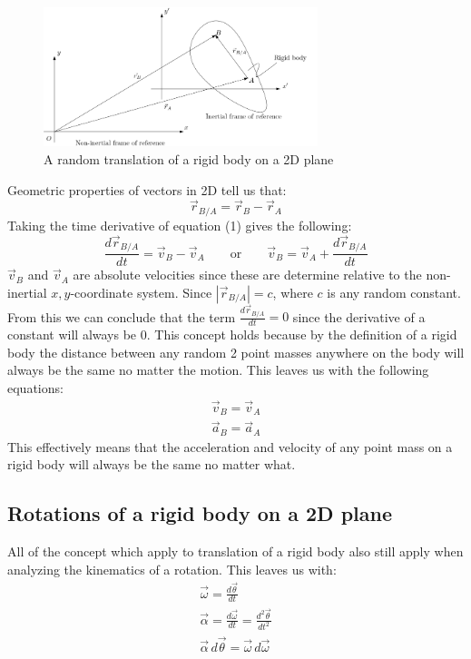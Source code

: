 \documentclass[11pt, a4paper]{article}
\begin{document}
\begin{figure}[h]
    \centerline{\includegraphics[width=80mm]{images/distance_vectors.png}}
    \caption{A random translation of a rigid body on a 2D plane}
\end{figure}
Geometric properties of vectors in 2D tell us that:
\begin{equation}
    \vec{r}_{B/A} = \vec{r}_B - \vec{r}_A
\end{equation}
Taking the time derivative of equation (1) gives the following:
\begin{equation}
    \frac{d\vec{r}_{B/A}}{dt} = \vec{v}_B - \vec{v}_A \qquad \text{or} \qquad \vec{v}_B = \vec{v}_A + \frac{d\vec{r}_{B/A}}{dt}
\end{equation}
$\vec{v}_B$ and $\vec{v}_A$ are absolute velocities since these are determine relative to the non-inertial $x,y$-coordinate system. Since $|\vec{r}_{B/A}| = c$, where $c$ is any random constant. From this we can conclude that the term $\frac{d\vec{r}_{B/A}}{dt} = 0$ since the derivative of a constant will always be 0. This concept holds because by the definition of a rigid body the distance between any random 2 point masses anywhere on the body will always be the same no matter the motion. This leaves us with the following equations:
\begin{gather}
    \vec{v}_B = \vec{v}_A\\
    \vec{a}_B = \vec{a}_A
\end{gather}
This effectively means that the acceleration and velocity of any point mass on a rigid body will always be the same no matter what.

\subsection{Rotations of a rigid body on a 2D plane}
All of the concept which apply to translation of a rigid body also still apply when analyzing the kinematics of a rotation. This leaves us with:
\begin{gather}
    \vec{\omega} = \frac{d\vec{\theta}}{dt}\\
    \vec{\alpha} = \frac{d\vec{\omega}}{dt} = \frac{d^2\vec{\theta}}{dt^2}\\
    \vec{\alpha}\,d\vec{\theta} = \vec{\omega}\,d\vec{\omega}
\end{gather}
\end{document}
